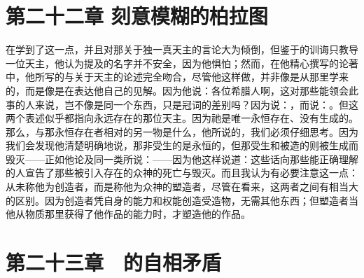 
\section{第二十二章 刻意模糊的柏拉图}

在学到了这一点，并且对那关于独一真天主的言论大为倾倒，但鉴于的训诲只教导一位天主，他认为提及的名字并不安全，因为他惧怕；然而，在他精心撰写的论著中，他所写的与关于天主的论述完全吻合，尽管他这样做，并非像是从那里学来的，而是像是在表达他自己的见解。因为他说：各位希腊人啊，这对那些能领会此事的人来说，岂不像是同一个东西，只是冠词的差别吗？因为说：，而说：。但这两个表述似乎都指向永远存在的那位天主。因为祂是唯一永恒存在、没有生成的。那么，与那永恒存在者相对的另一物是什么，他所说的，我们必须仔细思考。因为我们会发现他清楚明确地说，那非受生的是永恒的，但那受生和被造的则被生成而毁灭——正如他论及同一类所说：——因为他这样说道：这些话向那些能正确理解的人宣告了那些被引入存在的众神的死亡与毁灭。而且我认为有必要注意这一点：从未称他为创造者，而是称他为众神的塑造者，尽管在看来，这两者之间有相当大的区别。因为创造者凭自身的能力和权能创造受造物，无需其他东西；但塑造者当他从物质那里获得了他作品的能力时，才塑造他的作品。\par


\section{第二十三章　的自相矛盾}

